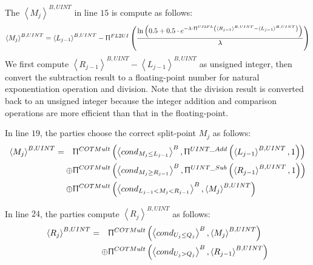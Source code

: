       The $\left\langle {M_j}\right\rangle^{B,UINT}$ in line $15$ is compute as follows:
      \begin{equation}
            \label{eq:ISMiddlePointline15}
            \begin{split}
                  \left\langle {M_j}\right\rangle^{B,UINT} =\left\langle {L_{j-1}}\right\rangle^{B,UINT}- \Uppi^{FL2UI} \left(\frac{\ln\left(0.5+0.5\cdot e^{-\lambda\cdot \Uppi^{UI2FL} \left(\left\langle {R_{j-1}}\right\rangle^{B,UINT}-\left\langle {L_{j-1}}\right\rangle^{B,UINT}\right) }\right)  }{\lambda}\right)
            \end{split}
      \end{equation}
      We first compute $\left\langle {R_{j-1}}\right\rangle^{B,UINT}-\left\langle {L_{j-1}}\right\rangle^{B,UINT}$ as unsigned integer, then convert the subtraction result to a floating-point number for natural exponentiation operation and division. Note that the division result is converted back to an unsigned integer because the integer addition and comparison operations are more efficient than that in the floating-point.

      In line $19$, the parties choose the correct split-point $M_j$ as follows:
      \begin{equation}
            \label{eq:ISMiddlePointline19}
            \begin{split}
                  \left\langle {M_j}\right\rangle ^{B,UINT}=\quad & \Uppi^{COTMult}\left(\left\langle cond_{M_{j}\leq L_{j-1}}\right\rangle ^B , \Uppi^{UINT\_Add}\left(\left\langle {L_{j-1}}\right\rangle^{B,UINT},1 \right)\right) \\
                  \oplus &\Uppi^{COTMult}\left(\left\langle cond_{M_{j} \geq R_{j-1}}\right\rangle ^B , \Uppi^{UINT\_Sub}\left(\left\langle {R_{j-1}}\right\rangle ^{B,UINT},1\right)\right)  \\
                  \oplus & \Uppi^{COTMult}\left(\left\langle cond_{L_{j-1}<M_{j} < R_{j-1}}\right\rangle^B , \left\langle {M_j}\right\rangle^{B,UINT}\right)
            \end{split}
      \end{equation}

      In line $24$, the parties compute $\left\langle {R_{j}}\right\rangle^{B,UINT}$ as follows:
      \begin{equation}
            \label{eq:ISRightPointline24}
            \begin{split}
                  \left\langle {R_{j}}\right\rangle^{B,UINT}=\quad & \Uppi^{COTMult}\left( \left\langle cond_{U_{j}\leq Q_{j}}\right\rangle ^{B} , \left\langle {M_j}\right\rangle ^{B,UINT}\right)  \\
                  \oplus   &  \Uppi^{COTMult}\left( \left\langle cond_{U_{j}> Q_{j}}\right\rangle ^{B} , \left\langle {R_{j-1}}\right\rangle^{B,UINT}\right)
            \end{split}
      \end{equation}

